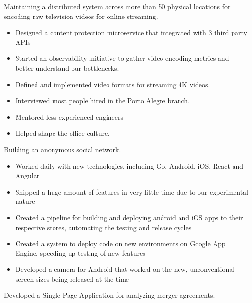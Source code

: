 \documentclass[10pt,a4paper,ragged2e,withhyper]{altacv}
\begin{document}
\begin{paracol}{2}
\divider


{\RaggedRight
Maintaining a distributed system across more than 50 physical locations for encoding raw television videos for online streaming.

\begin{itemize}
\item Designed a content protection microservice that integrated with 3 third party APIs
\item Started an observability initiative to gather video encoding metrics and better understand our bottlenecks.
\item Defined and implemented video formats for streaming 4K videos.
\item Interviewed most people hired in the Porto Alegre branch.
\item Mentored less experienced engineers
\item Helped shape the office culture.
\end{itemize}
}

\divider


{\RaggedRight
Building an anonymous social network.

\begin{itemize}
\item Worked daily with new technologies, including Go, Android, iOS, React and Angular
\item Shipped a huge amount of features in very little time due to our experimental nature
\item Created a pipeline for building and deploying android and iOS apps to their respective stores, automating the testing and release cycles
\item Created a system to deploy code on new environments on Google App Engine, speeding up testing of new features
\item Developed a camera for Android that worked on the new, unconventional screen sizes being released at the time
\end{itemize}
}

\divider


{\RaggedRight
Developed a Single Page Application for analyzing merger agreements.

}
\end{paracol}
\end{document}
